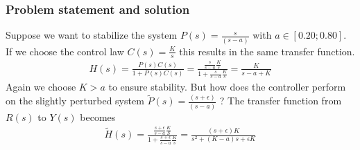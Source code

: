 \begin{frame}
	\frametitle{Problem statement and solution}
	\begin{example}
		Suppose we want to stabilize the system $P(s)=\frac{s}{(s - a)}$ with $a\in[0.20;0.80]$. If we choose the control law $C(s)=\frac{K}{s}$ this results in the same transfer function.
		\vspace{-0.5em}
		\begin{align*}
			H(s) = \frac{P(s)C(s)}{1+P(s)C(s)} = \frac{\frac{s}{s-a}\frac{K}{s}}{1+\frac{s}{s-a} \frac{K}{s}} = \frac{K}{s-a+K}
		\end{align*}
		Again we choose $K>a$ to ensure stability.
		But how does the controller perform on the slightly perturbed system $\tilde{P}(s)=\frac{(s+\epsilon)}{(s - a)}$  ?
		The transfer function from $R(s)$ to $Y(s)$ becomes
				\vspace{-0.5em}
		\begin{align*}
			\tilde{H}(s) = \frac{\frac{s+\epsilon}{s-a} \frac{K}{S}}{1+\frac{s+\epsilon}{s-a}\frac{K}{s}}
			= \frac{(s+\epsilon)K}{s^2 + (K-a)s + \epsilon K}
		\end{align*}
	\end{example}
\end{frame}

